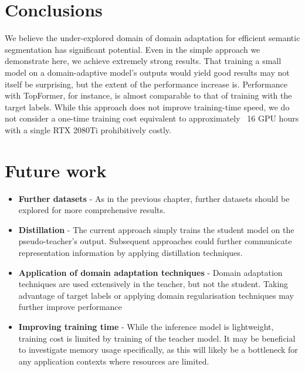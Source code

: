 \documentclass[a4paper,12pt]{report}
\begin{document}
\section{Conclusions}
We believe the under-explored domain of domain adaptation for efficient semantic segmentation has significant potential. Even in the simple approach we demonstrate here, we achieve extremely strong results. That training a small model on a domain-adaptive model's outputs would yield good results may not itself be surprising, but the extent of the performance increase is. Performance with TopFormer, for instance, is almost comparable to that of training with the target labels.
While this approach does not improve training-time speed, we do not consider a one-time training cost equivalent to approximately ~16 GPU hours with a single RTX 2080Ti prohibitively costly.

\section{Future work}
\begin{itemize}
    \item \textbf{Further datasets} - As in the previous chapter, further datasets should be explored for more comprehensive results.
    \item \textbf{Distillation} - The current approach simply trains the student model on the pseudo-teacher's output. Subsequent approaches could further communicate representation information by applying distillation techniques.
    \item \textbf{Application of domain adaptation techniques} - Domain adaptation techniques are used extensively in the teacher, but not the student. Taking advantage of target labels or applying domain regularisation techniques may further improve performance
    \item \textbf{Improving training time} - While the inference model is lightweight, training cost is limited by training of the teacher model. It may be beneficial to investigate memory usage specifically, as this will likely be a bottleneck for any application contexts where resources are limited.
\end{itemize}

\FloatBarrier

\end{document}
